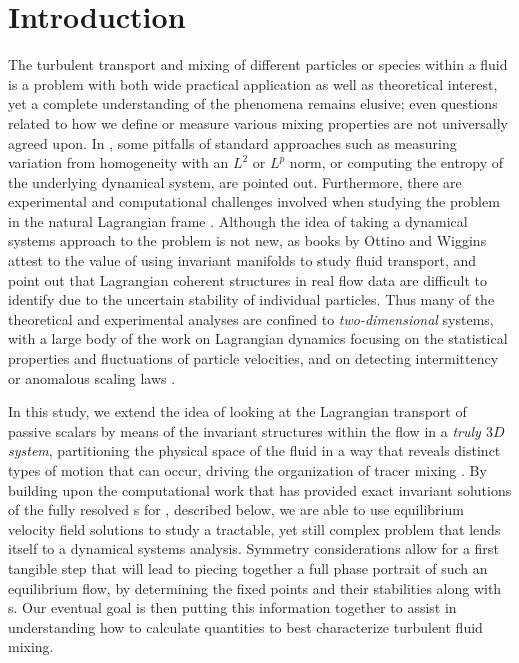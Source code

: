

\section{Introduction}
\label{s:intro}

The turbulent transport and mixing of different particles or species 
within a fluid is a problem with both wide practical application as well 
as theoretical interest, yet a complete understanding of the phenomena 
remains elusive; even questions related to how we define or measure 
various mixing properties are not universally agreed upon. In 
\cite{MaMPe05}, some pitfalls of standard approaches such as measuring 
variation from homogeneity with an $L^2$ or $L^p$ norm, or computing the 
entropy of the underlying dynamical system, are pointed out. Furthermore, 
there are experimental and computational challenges involved when 
studying the problem in the natural Lagrangian frame 
\cite{MHPRS07,ABBBBB08,BrLiEc06,MoLePi04}. Although the idea of taking a 
dynamical systems approach to the problem is not new, as books by Ottino 
\cite{Botti89} and Wiggins \cite{Wiggins1992} attest to the value of
using invariant manifolds to study fluid transport, \cite{MHPRS07} and 
\cite{Haller02} point out that Lagrangian coherent structures in 
real flow data are difficult to identify due to the uncertain stability 
of individual particles. Thus many of the theoretical and experimental 
analyses are confined to \textit{two-dimensional} systems, with a large 
body of the work on Lagrangian dynamics focusing on the statistical 
properties and fluctuations of particle velocities, and on detecting 
intermittency or anomalous scaling laws 
\cite{EgeChi22,MoLePi04,ABBBBB08,FaGaVe01}. 

In this study, we extend the idea of looking at the Lagrangian transport 
of passive scalars by means of the invariant structures within the flow 
in a \textit{truly $3D$ system}, partitioning the physical space of the 
fluid in a way that reveals distinct types of motion that can occur, 
driving the organization of tracer mixing \cite{Haller02}. By building 
upon the computational work that has provided exact invariant solutions 
of the fully resolved {\NSe}s for {\pCf}, 
described below, we are able to use equilibrium velocity field solutions 
to study a tractable, yet still complex problem that lends itself to a 
dynamical systems analysis. Symmetry considerations allow for a first 
tangible step that will lead to piecing together a full phase portrait of 
such an equilibrium flow, by determining the fixed points and their 
stabilities along with {\hc}s.  Our eventual goal is 
then putting this information together to assist in understanding how to 
calculate quantities to best characterize turbulent fluid mixing. 

